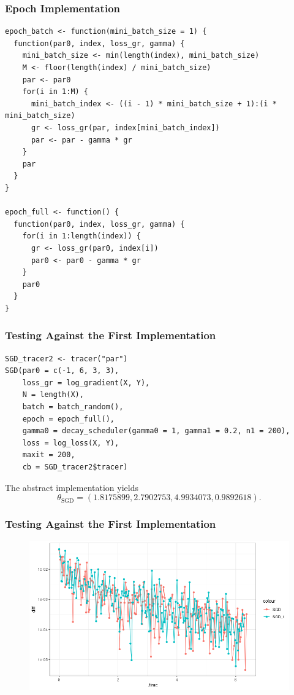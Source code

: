 \documentclass[aspectratio=169]{beamer}
\begin{document}
\begin{frame}[fragile]
    \frametitle{Epoch Implementation}
\begin{verbatim}
epoch_batch <- function(mini_batch_size = 1) {
  function(par0, index, loss_gr, gamma) {
    mini_batch_size <- min(length(index), mini_batch_size)
    M <- floor(length(index) / mini_batch_size)
    par <- par0
    for(i in 1:M) {
      mini_batch_index <- ((i - 1) * mini_batch_size + 1):(i * mini_batch_size)
      gr <- loss_gr(par, index[mini_batch_index])
      par <- par - gamma * gr
    }
    par
  }
}

epoch_full <- function() {
  function(par0, index, loss_gr, gamma) {
    for(i in 1:length(index)) {
      gr <- loss_gr(par0, index[i])
      par0 <- par0 - gamma * gr
    }
    par0
  }
}
\end{verbatim}
\end{frame}
\begin{frame}[fragile]
    \frametitle{Testing Against the First Implementation}
\begin{verbatim}
SGD_tracer2 <- tracer("par")
SGD(par0 = c(-1, 6, 3, 3),
    loss_gr = log_gradient(X, Y),
    N = length(X),
    batch = batch_random(),
    epoch = epoch_full(),
    gamma0 = decay_scheduler(gamma0 = 1, gamma1 = 0.2, n1 = 200),
    loss = log_loss(X, Y),
    maxit = 200,
    cb = SGD_tracer2$tracer)
\end{verbatim}
The abstract implementation yields
\begin{equation}
    \theta_{\text{SGD}}=(1.8175899, 2.7902753, 4.9934073, 0.9892618).
\end{equation}
\end{frame}
\begin{frame}
    \frametitle{Testing Against the First Implementation}
    \begin{figure}
        \centering
        \includegraphics[scale = 0.4]{figure/ComparisonSGD_1.png}
    \end{figure}
\end{frame}
\end{document}
